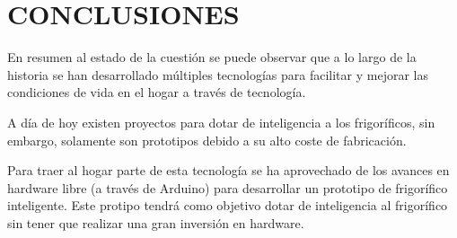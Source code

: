 \section{CONCLUSIONES}

En resumen al estado de la cuestión se puede observar que a lo largo de la historia se han desarrollado múltiples tecnologías para facilitar y mejorar las condiciones de vida en el hogar a través de tecnología.


A día de hoy existen proyectos para dotar de inteligencia a los frigoríficos, sin embargo, solamente son prototipos debido a su alto coste de fabricación.

Para traer al hogar parte de esta tecnología se ha aprovechado de los avances en hardware libre (a través de Arduino) para desarrollar un prototipo de frigorífico inteligente. Este protipo tendrá como objetivo dotar de inteligencia al frigorífico sin tener que realizar una gran inversión en hardware.